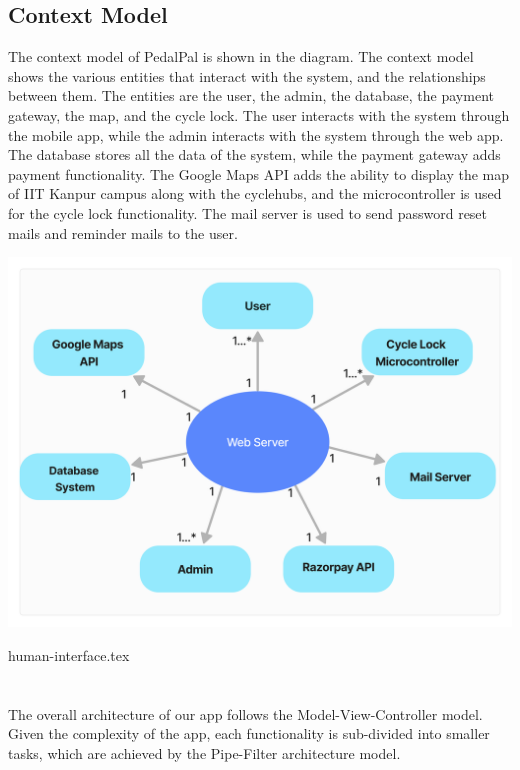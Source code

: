 \documentclass[11pt]{article}
\begin{document}
\subsection{Context Model}
The context model of PedalPal is shown in the diagram. The context model shows the various entities that interact with the system, and the relationships between them. The entities are the user, the admin, the database, the payment gateway, the map, and the cycle lock. The user interacts with the system through the mobile app, while the admin interacts with the system through the web app. The database stores all the data of the system, while the payment gateway adds payment functionality. The Google Maps API adds the ability to display the map of IIT Kanpur campus along with the cyclehubs, and the microcontroller is used for the cycle lock functionality. The mail server is used to send password reset mails and reminder mails to the user.
\begin{center}
  \includegraphics[scale=0.1]{state-diagram-images/context-model.jpg}
\end{center}

 {human-interface.tex}

\newpage
\section{}
The overall architecture of our app follows the Model-View-Controller model. Given the complexity of the app, each functionality is sub-divided into smaller tasks, which are achieved by the Pipe-Filter architecture model.
\end{document}

